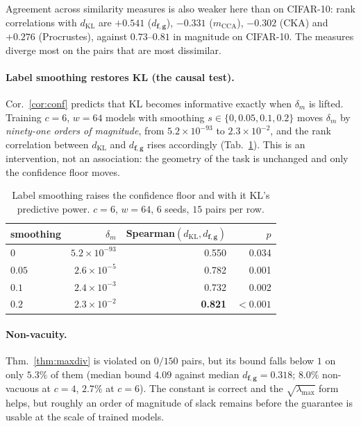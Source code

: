 \documentclass[10pt,letterpaper,twocolumn]{article}
\newcommand{\bff}{\mathbf{f}}
\newcommand{\bfg}{\mathbf{g}}
\newcommand{\dKL}{d_{\mathrm{KL}}}
\newcommand{\dfg}{d_{\bff,\bfg}}
\newcommand{\mCCA}{m_{\mathrm{CCA}}}
\theoremstyle{plain}
\theoremstyle{definition}
\theoremstyle{remark}
\begin{document}
Agreement across similarity measures is also weaker here than on CIFAR-10:
rank correlations with $\dKL$ are $+0.541$ ($\dfg$), $-0.331$ ($\mCCA$),
$-0.302$ (CKA) and $+0.276$ (Procrustes), against $0.73$--$0.81$ in magnitude
on CIFAR-10. The measures diverge most on the pairs that are most dissimilar.

\paragraph{Label smoothing restores KL (the causal test).}
Cor.~\ref{cor:conf} predicts that KL becomes informative exactly when
$\delta_{m}$ is lifted. Training $c{=}6$, $w{=}64$ models with smoothing
$s\in\{0,0.05,0.1,0.2\}$ moves $\delta_{m}$ by \emph{ninety-one orders of
magnitude}, from $5.2\times10^{-93}$ to $2.3\times10^{-2}$, and the rank
correlation between $\dKL$ and $\dfg$ rises accordingly
(Tab.~\ref{tab:smooth}). This is an intervention, not an association: the
geometry of the task is unchanged and only the confidence floor moves.

\begin{table}[t]
\centering\small
\caption{Label smoothing raises the confidence floor and with it KL's
predictive power. $c=6$, $w=64$, $6$ seeds, $15$ pairs per row.}
\label{tab:smooth}
\begin{tabular}{@{}lrrr@{}}
\toprule
smoothing & $\delta_{m}$ & Spearman$(\dKL,\dfg)$ & $p$ \\
\midrule
$0$    & $5.2\times10^{-93}$ & 0.550 & 0.034 \\
$0.05$ & $2.6\times10^{-5}$  & 0.782 & 0.001 \\
$0.1$  & $2.4\times10^{-3}$  & 0.732 & 0.002 \\
$0.2$  & $2.3\times10^{-2}$  & \textbf{0.821} & $<0.001$ \\
\bottomrule
\end{tabular}
\end{table}

\paragraph{Non-vacuity.}
Thm.~\ref{thm:maxdiv} is violated on $0/150$ pairs, but its bound falls below
$1$ on only $5.3\%$ of them (median bound $4.09$ against median $\dfg=0.318$;
$8.0\%$ non-vacuous at $c{=}4$, $2.7\%$ at $c{=}6$). The constant is correct
and the $\sqrt{\lambda_{\max}}$ form helps, but roughly an order of magnitude
of slack remains before the guarantee is usable at the scale of trained models.
\end{document}

